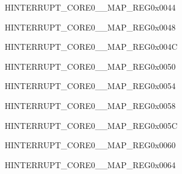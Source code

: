 \begin{register}{H}{INTERRUPT\_CORE0\_\_MAP\_REG}{0x0044}\label{regdesc:INTERRUPTCORE0GPIOINTERRUPTPRONMIMAPREG}
\end{register}
\vspace{-3em}

\begin{register}{H}{INTERRUPT\_CORE0\_\_MAP\_REG}{0x0048}\label{regdesc:INTERRUPTCORE0GPIOINTERRUPTAPPMAPREG}
\end{register}
\vspace{-3em}

\begin{register}{H}{INTERRUPT\_CORE0\_\_MAP\_REG}{0x004C}\label{regdesc:INTERRUPTCORE0GPIOINTERRUPTAPPNMIMAPREG}
\end{register}
\vspace{-3em}

\begin{register}{H}{INTERRUPT\_CORE0\_\_MAP\_REG}{0x0050}\label{regdesc:INTERRUPTCORE0SPIINTR1MAPREG}
\end{register}
\vspace{-3em}

\begin{register}{H}{INTERRUPT\_CORE0\_\_MAP\_REG}{0x0054}\label{regdesc:INTERRUPTCORE0SPIINTR2MAPREG}
\end{register}
\vspace{-3em}

\begin{register}{H}{INTERRUPT\_CORE0\_\_MAP\_REG}{0x0058}\label{regdesc:INTERRUPTCORE0SPIINTR3MAPREG}
\end{register}
\vspace{-3em}

\begin{register}{H}{INTERRUPT\_CORE0\_\_MAP\_REG}{0x005C}\label{regdesc:INTERRUPTCORE0SPIINTR4MAPREG}
\end{register}
\vspace{-3em}

\begin{register}{H}{INTERRUPT\_CORE0\_\_MAP\_REG}{0x0060}\label{regdesc:INTERRUPTCORE0LCDCAMINTMAPREG}
\end{register}
\vspace{-3em}

\begin{register}{H}{INTERRUPT\_CORE0\_\_MAP\_REG}{0x0064}\label{regdesc:INTERRUPTCORE0I2S0INTMAPREG}
\end{register}
\vspace{-3em}

